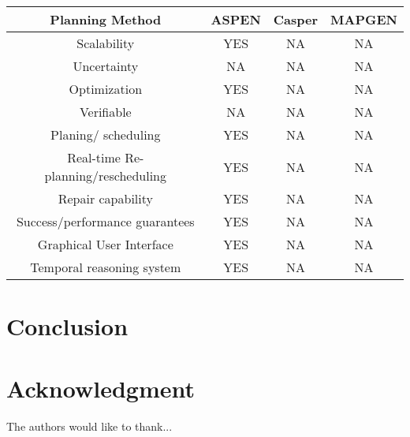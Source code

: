\documentclass[conference]{IEEEtran}
\begin{document}
\begin{center}
\begin {tabular}{ c|c|c|c }
 \hline
 \hline
Planning Method & ASPEN & Casper &MAPGEN\\
 \hline
Scalability   &YES   &NA   &NA\\
Uncertainty   &NA    &NA   &NA\\
Optimization   &YES    &NA   &NA\\
Verifiable    &NA &NA &NA\\
Planing/ scheduling &YES  &NA   &NA\\
Real-time Re-planning/rescheduling &YES    &NA   &NA\\
Repair capability &YES    &NA   &NA\\
Success/performance guarantees &YES &NA &NA\\
Graphical User Interface &YES  &NA &NA\\
Temporal reasoning system  &YES &NA &NA \\
 \hline
\end{tabular}
\end{center}

\section{Conclusion}



\section*{Acknowledgment}
The authors would like to thank...
\end{document}
